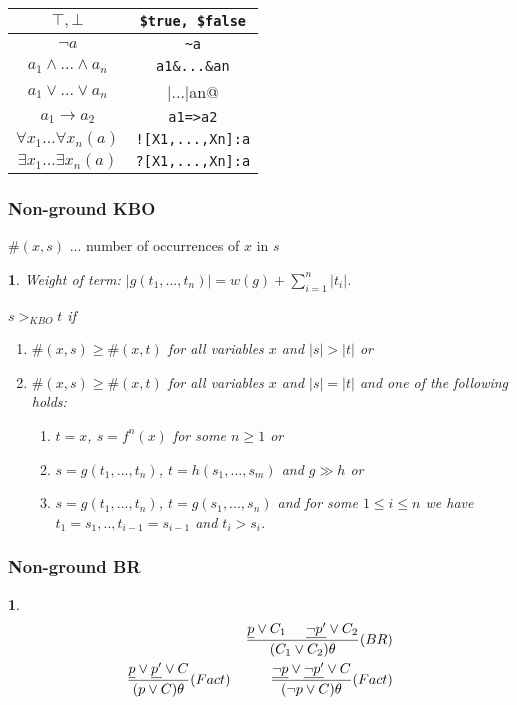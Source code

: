 \documentclass[9pt]{extarticle}
\theoremstyle{theoremstyle}
\newtheorem*{green}{}
\newtheorem*{blue}{}
\begin{document}
\begin{multicols}{3}
\begin{minipage}[t]{.30\textwidth}
\begin{tabular}{c|c}
	$\top, \bot$ & \verb|$true, $false|\\
	\hline
	$\lnot a$ & \verb|~a|\\
	\hline
	$a_1 \land ... \land a_n$ & \verb|a1&...&an|\\
	\hline
	$a_1 \lor ... \lor a_n$ & \verb@a1|...|an@\\
	\hline
	$a_1 \rightarrow a_2$ & \verb|a1=>a2|\\
	\hline
	$\forall x_1 ... \forall x_n (a)$ & \verb|![X1,...,Xn]:a|\\
	\hline
	$\exists x_1 ... \exists x_n (a)$ & \verb|?[X1,...,Xn]:a|\\
\end{tabular}

\end{minipage}\hfil

\begin{minipage}[t]{.30\textwidth}

\subsubsection*{Non-ground KBO}

$\#(x,s)$ ... number of occurrences of $x$ in $s$

\begin{green}
Weight of term: $|g(t_1,...,t_n)| = w(g) + \sum_{i=1}^{n}|t_i|$.

$s >_{KBO} t$ if
\begin{enumerate}
	\item $\#(x,s) \geq \#(x,t)$ for all variables $x$ and $|s|>|t|$ or
	\item $\#(x,s) \geq \#(x,t)$ for all variables $x$ and $|s|=|t|$ and one of the following holds:
	\begin{enumerate}
		\item $t=x$, $s=f^n(x)$ for some $n\geq 1$ or
		\item $s=g(t_1,...,t_n)$, $t=h(s_1,...,s_m)$ and $g \gg h$ or
		\item $s=g(t_1,...,t_n)$, $t=g(s_1,...,s_n)$ and for some $1\leq i \leq n$ we have $t_1=s_1,.., t_{i-1}=s_{i-1}$ and $t_i > s_i$.
	\end{enumerate}
\end{enumerate}
\end{green}

\subsubsection*{Non-ground BR}
\begin{blue}
\begin{align*}
	\frac{\underline{p}\lor C_1 \hspace{.5cm} \underline{\lnot p'} \lor C_2}{(C_1 \lor C_2)\theta} (BR)\\
	\frac{\underline{p}\lor \underline{p'} \lor C}{(p \lor C)\theta} (Fact) \hspace{1cm} \frac{\underline{\lnot p}\lor \underline{\lnot p'} \lor C}{(\lnot p \lor C)\theta} (Fact)
\end{align*}


\end{blue}
\end{minipage}
\end{multicols}
\end{document}
